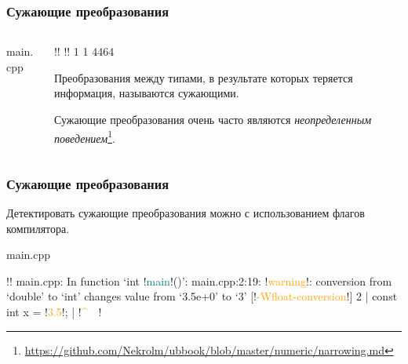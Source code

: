 \documentclass[compress, 8pt]{beamer}
\begin{document}
\begin{frame}[fragile]

    \frametitle{Сужающие преобразования}

    \begin{columns}[T]

        \begin{column}{0.5\textwidth}

                {main.cpp}

        \end{column}

        \begin{column}{0.5\textwidth}

            \begin{terminalwindow}
!!
!!
1
1
4464
            \end{terminalwindow}

            Преобразования между типами, в результате которых теряется информация,
            называются сужающими.

            \hfill\break
            Сужающие преобразования очень часто являются
            \textit{неопределенным поведением}\footnote{\url{https://github.com/Nekrolm/ubbook/blob/master/numeric/narrowing.md}}.

        \end{column}

    \end{columns}

\end{frame}

\begin{frame}[fragile]

    \frametitle{Сужающие преобразования}

    Детектировать сужающие преобразования можно с использованием флагов компилятора.

        {main.cpp}

    \begin{terminalwindow}
!!
main.cpp: In function ‘int !\textcolor{teal}{main}!()’:
main.cpp:2:19: !\textcolor{orange}{warning}!: conversion from ‘double’ to ‘int’ changes value from ‘3.5e+0’ to ‘3’ [!\textcolor{orange}{-Wfloat-conversion}!]
    2 |     const int x = !\textcolor{orange}{3.5}!;
      |                   !\textcolor{orange}{\^{}~~}!
    \end{terminalwindow}

\end{frame}
\end{document}
